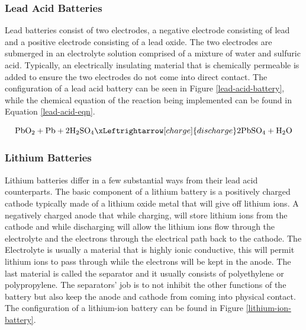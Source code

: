 \subsubsection{Lead Acid Batteries}
Lead batteries consist of two electrodes, a negative electrode consisting of lead and a positive electrode consisting of a lead oxide. The two electrodes are submerged in an electrolyte solution comprised of a mixture of water and sulfuric acid. Typically, an electrically insulating material that is chemically permeable is added to ensure the two electrodes do not come into direct contact. The configuration of a lead acid battery can be seen in Figure \ref{lead-acid-battery}, while the chemical equation of the reaction being implemented can be found in Equation \ref{lead-acid-eqn}.

\begin{equation}
    \text{PbO}_2 + \text{Pb} + 2\text{H}_2\text{SO}_4
    \xLeftrightarrow[charge]{discharge}
    2\text{PbSO}_4 + \text{H}_2\text{O}
    \label{lead-acid-eqn}
\end{equation}

\subsubsection{Lithium Batteries}
Lithium batteries differ in a few substantial ways from their lead acid counterparts. The basic component of a lithium battery is a positively charged cathode typically made of a lithium oxide metal that will give off lithium ions. A negatively charged anode that while charging, will store lithium ions from the cathode and while discharging will allow the lithium ions flow through the electrolyte and the electrons through the electrical path back to the cathode. The Electrolyte is usually a material that is highly ionic conductive, this will permit lithium ions to pass through while the electrons will be kept in the anode. The last material is called the separator and it usually consists of polyethylene or polypropylene. The separators' job is to not inhibit the other functions of the battery but also keep the anode and cathode from coming into physical contact. The configuration of a lithium-ion battery can be found in Figure \ref{lithium-ion-battery}.

